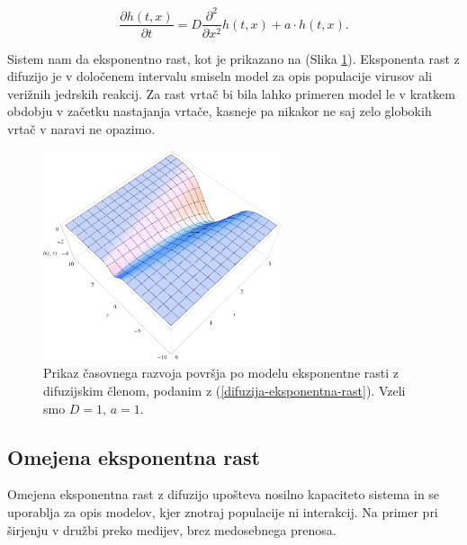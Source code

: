 \documentclass[a4paper, twoside, 12pt]{book}
\begin{document}
    \begin{equation}
      \frac{ \partial h(t,x) }{ \partial t} = D \frac{\partial^2}{\partial x^2} h(t,x) + a \cdot h(t,x).
      \label{difuzija-eksponentna-rast}
    \end{equation}

Sistem nam da eksponentno rast, kot je prikazano na (Slika \ref{fig:difuzija-eksponentna-rast}).
Eksponenta rast z difuzijo je v določenem intervalu smiseln model za opis populacije virusov ali verižnih jedrskih reakcij. Za rast vrtač bi bila lahko primeren model le v kratkem obdobju v začetku nastajanja vrtače, kasneje pa nikakor ne saj zelo globokih vrtač v naravi ne opazimo.
    \begin{figure}[h!]
      \begin{center}
        \includegraphics[width=7cm]{slike/difuzija-eksponentna-rast2}
      \end{center}
      \caption{Prikaz časovnega razvoja površja po modelu eksponentne rasti z difuzijskim členom, podanim z (\ref{difuzija-eksponentna-rast}). Vzeli smo $D=1$, $a=1$.}
      \label{fig:difuzija-eksponentna-rast}
    \end{figure}

\subsection{Omejena eksponentna rast}

    Omejena eksponentna rast z difuzijo upošteva nosilno kapaciteto sistema in se uporablja za opis modelov, kjer znotraj populacije ni interakcij. Na primer pri širjenju v družbi preko medijev, brez medosebnega prenosa.\\
\end{document}
